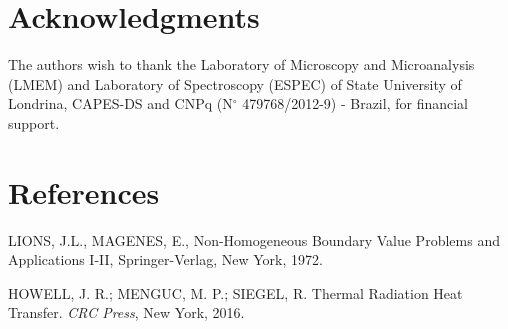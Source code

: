 \documentclass[article,10pt,twoside,a4paper,twocolumn,hidelinks,english,brazil]{abntex2}
\begin{document}
\postextual
\pagestyle{text}


\section*{Acknowledgments}
 The authors wish to thank the Laboratory of Microscopy and Microanalysis (LMEM) and Laboratory of Spectroscopy (ESPEC) of State University of Londrina, CAPES-DS and CNPq (N$^{\circ}$ 479768/2012-9) - Brazil, for financial support.


 
 
\section*{References}
\vspace{-1.5cm}
\renewcommand{\bibname}{}
\providecommand{\abntreprintinfo}[1]{%
 \citeonline{#1}}
\setlength{\labelsep}{0pt}
\begin{thebibliography}{}
\providecommand{\abntrefinfo}[3]{}
\providecommand{\abntbstabout}[1]{}
\abntbstabout{v-1.9.6 }



\abntrefinfo{Lions}{LIONS \textit{et al}.}{1972}
{LIONS, J.L.,  MAGENES, E.,
Non-Homogeneous Boundary Value Problems and Applications I-II,
Springer-Verlag, New York, 1972.}


\abntrefinfo{HOWELL}{HOWELL \textit{et al}.}{2016}
{HOWELL, J. R.; MENGUC, M. P.; SIEGEL, R.  Thermal Radiation Heat Transfer. \textit{CRC Press}, New York, 2016.}

 \end{thebibliography}{}  


\newpage %
\vspace*{\fill}
\end{document}
